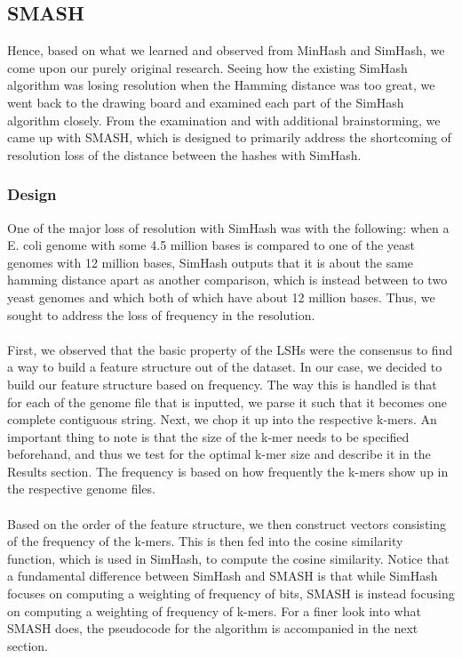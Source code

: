 \documentclass[12pt, letterpaper]{article}
\begin{document}
\subsection{SMASH}
Hence, based on what we learned and observed from MinHash and SimHash, we come upon our purely original research. Seeing how the existing SimHash algorithm was losing resolution when the Hamming distance was too great, we went back to the drawing board and examined each part of the SimHash algorithm closely. From the examination and with additional brainstorming, we came up with SMASH, which is designed to primarily address the shortcoming of resolution loss of the distance between the hashes with SimHash.

\subsubsection{Design}
One of the major loss of resolution with SimHash was with the following: when a E. coli genome with some 4.5 million bases is compared to one of the yeast genomes with 12 million bases, SimHash outputs that it is about the same hamming distance apart as another comparison, which is instead between to two yeast genomes and which both of which have about 12 million bases. Thus, we sought to address the loss of frequency in the resolution.  \\ \\
First, we observed that the basic property of the LSHs were the consensus to find a way to build a feature structure out of the dataset. In our case, we decided to build our feature structure based on frequency. The way this is handled is that for each of the genome file that is inputted, we parse it such that it becomes one complete contiguous string. Next, we chop it up into the respective k-mers. An important thing to note is that the size of the k-mer needs to be specified beforehand, and thus we test for the optimal k-mer size and describe it in the Results section. The frequency is based on how frequently the k-mers show up in the respective genome files. \\ \\
Based on the order of the feature structure, we then construct vectors consisting of the frequency of the k-mers. This is then fed into the cosine similarity function, which is used in SimHash, to compute the cosine similarity. Notice that a fundamental difference between SimHash and SMASH is that while SimHash focuses on computing a weighting of frequency of bits, SMASH is instead focusing on computing a weighting of frequency of k-mers. For a finer look into what SMASH does, the pseudocode for the algorithm is accompanied in the next section.
\end{document}
